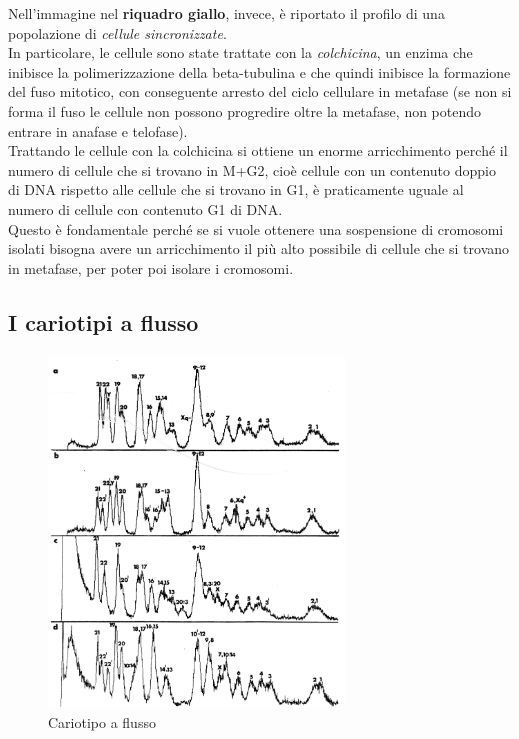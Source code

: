\documentclass[11pt]{book}
\begin{document}
Nell’immagine nel \textbf{riquadro giallo}, invece, è riportato il profilo di una popolazione di \emph{cellule sincronizzate}.\\
In particolare, le cellule sono state trattate con la \emph{colchicina}, un enzima che inibisce la polimerizzazione della beta-tubulina e che quindi inibisce la formazione del fuso mitotico, con conseguente arresto del ciclo cellulare in metafase (se non si forma il fuso le cellule non possono progredire oltre la metafase, non potendo entrare in anafase e telofase).\\
Trattando le cellule con la colchicina si ottiene un enorme arricchimento perché il numero di cellule che si trovano in M+G2, cioè cellule con un contenuto doppio di DNA rispetto alle cellule che si trovano in G1, è praticamente uguale al numero di cellule con contenuto G1 di DNA.\\
Questo è fondamentale perché se si vuole ottenere una sospensione di cromosomi isolati bisogna avere un arricchimento il più alto possibile di cellule che si trovano in metafase, per poter poi isolare i cromosomi.
 

\subsection{I cariotipi a flusso}

\begin{figure}
    \includegraphics[width=0.70\textwidth]{img/45_cariotipo_a_flusso.png}
  \caption{Cariotipo a flusso}
\end{figure}
\end{document}
